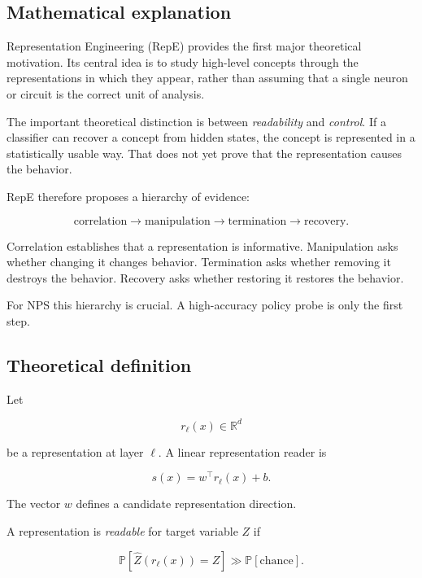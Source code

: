 \documentclass[11pt]{article}
\newcommand{\R}{\mathbb{R}}
\newcommand{\Prob}{\mathbb{P}}
\begin{document}
\subsection*{Mathematical explanation}

Representation Engineering (RepE) provides the first major theoretical
motivation. Its central idea is to study high-level concepts through the
representations in which they appear, rather than assuming that a single
neuron or circuit is the correct unit of analysis.

The important theoretical distinction is between \emph{readability} and
\emph{control}. If a classifier can recover a concept from hidden states, the
concept is represented in a statistically usable way. That does not yet prove
that the representation causes the behavior.

RepE therefore proposes a hierarchy of evidence:

\begin{equation}
\text{correlation}
\rightarrow
\text{manipulation}
\rightarrow
\text{termination}
\rightarrow
\text{recovery}.
\end{equation}

Correlation establishes that a representation is informative. Manipulation
asks whether changing it changes behavior. Termination asks whether removing
it destroys the behavior. Recovery asks whether restoring it restores the
behavior.

For NPS this hierarchy is crucial. A high-accuracy policy probe is only the
first step.

\subsection*{Theoretical definition}

Let

\begin{equation}
r_\ell(x)\in\R^d
\end{equation}

be a representation at layer $\ell$. A linear representation reader is

\begin{equation}
s(x)=w^\top r_\ell(x)+b.
\end{equation}

The vector $w$ defines a candidate representation direction.

A representation is \emph{readable} for target variable $Z$ if

\begin{equation}
\Prob\left[
\hat Z(r_\ell(x))=Z
\right]
\gg
\Prob[\text{chance}].
\end{equation}
\end{document}
